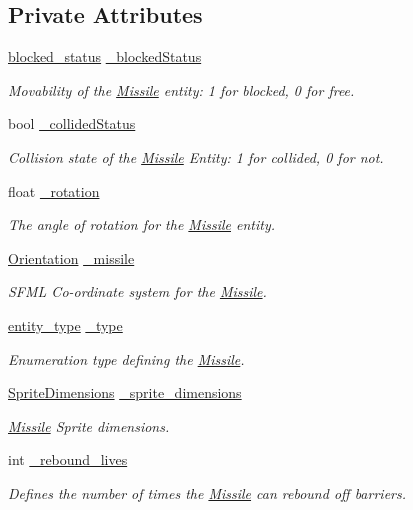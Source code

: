 \subsection*{Private Attributes}
\begin{DoxyCompactItemize}
\item 
\hyperlink{Structures_8h_a6fef29d9424addfa69bdd2a379424896}{blocked\-\_\-status} \hyperlink{classMissile_a34065d77889cdf8ac998d83dc0b3a242}{\-\_\-blocked\-Status}
\begin{DoxyCompactList}\small\item\em Movability of the \hyperlink{classMissile}{Missile} entity\-: 1 for blocked, 0 for free. \end{DoxyCompactList}\item 
bool \hyperlink{classMissile_a52e8aaac3c5db45c8d4c1ac74d001f57}{\-\_\-collided\-Status}
\begin{DoxyCompactList}\small\item\em Collision state of the \hyperlink{classMissile}{Missile} Entity\-: 1 for collided, 0 for not. \end{DoxyCompactList}\item 
float \hyperlink{classMissile_acd500cfc21ada9701b059cb4a77a5c96}{\-\_\-rotation}
\begin{DoxyCompactList}\small\item\em The angle of rotation for the \hyperlink{classMissile}{Missile} entity. \end{DoxyCompactList}\item 
\hyperlink{classOrientation}{Orientation} \hyperlink{classMissile_ae8ef6a656e69ac376dbc0db1b7153250}{\-\_\-missile}
\begin{DoxyCompactList}\small\item\em S\-F\-M\-L Co-\/ordinate system for the \hyperlink{classMissile}{Missile}. \end{DoxyCompactList}\item 
\hyperlink{Structures_8h_a6d8f83e710b27d4f86c45f0bb77066e3}{entity\-\_\-type} \hyperlink{classMissile_a2cbcb75f29640ba706e64cb620a7c6a7}{\-\_\-type}
\begin{DoxyCompactList}\small\item\em Enumeration type defining the \hyperlink{classMissile}{Missile}. \end{DoxyCompactList}\item 
\hyperlink{classSpriteDimensions}{Sprite\-Dimensions} \hyperlink{classMissile_a97a02568096e4900a56067e2f2b346fc}{\-\_\-sprite\-\_\-dimensions}
\begin{DoxyCompactList}\small\item\em \hyperlink{classMissile}{Missile} Sprite dimensions. \end{DoxyCompactList}\item 
int \hyperlink{classMissile_afc61d2903e66bc48c42bb70e7ddd55d8}{\-\_\-rebound\-\_\-lives}
\begin{DoxyCompactList}\small\item\em Defines the number of times the \hyperlink{classMissile}{Missile} can rebound off barriers. \end{DoxyCompactList}\end{DoxyCompactItemize}
